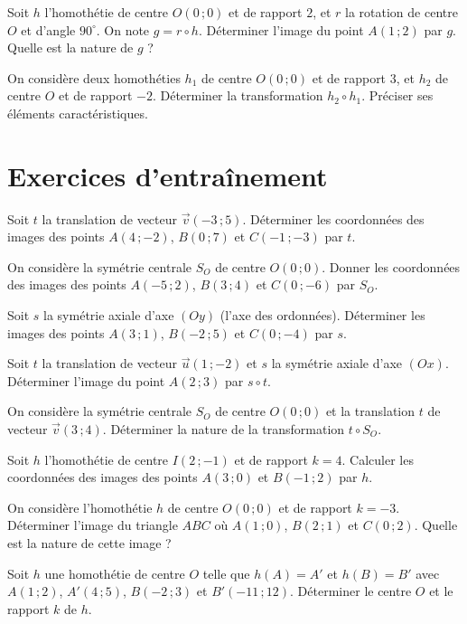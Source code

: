 \exo{}
Soit \(h\) l'homothétie de centre \(O(0\,; 0)\) et de rapport \(2\), et \(r\) la rotation de centre \(O\) et d'angle \(90^\circ\). On note \(g = r \circ h\). Déterminer l'image du point \(A(1\,; 2)\) par \(g\). Quelle est la nature de \(g\) ?

\exo{}
On considère deux homothéties \(h_1\) de centre \(O(0\,; 0)\) et de rapport \(3\), et \(h_2\) de centre \(O\) et de rapport \(-2\). Déterminer la transformation \(h_2 \circ h_1\). Préciser ses éléments caractéristiques.

\section{Exercices d'entraînement}


\exo{}
Soit \(t\) la translation de vecteur \(\vec{v}(-3\,; 5)\). Déterminer les coordonnées des images des points \(A(4\,; -2)\), \(B(0\,; 7)\) et \(C(-1\,; -3)\) par \(t\).

\exo{}
On considère la symétrie centrale \(S_O\) de centre \(O(0\,; 0)\). Donner les coordonnées des images des points \(A(-5\,; 2)\), \(B(3\,; 4)\) et \(C(0\,; -6)\) par \(S_O\).

\exo{}
Soit \(s\) la symétrie axiale d'axe \((Oy)\) (l'axe des ordonnées). Déterminer les images des points \(A(3\,; 1)\), \(B(-2\,; 5)\) et \(C(0\,; -4)\) par \(s\).

\exo{}
Soit \(t\) la translation de vecteur \(\vec{u}(1\,; -2)\) et \(s\) la symétrie axiale d'axe \((Ox)\). Déterminer l'image du point \(A(2\,; 3)\) par \(s \circ t\).

\exo{}
On considère la symétrie centrale \(S_O\) de centre \(O(0\,; 0)\) et la translation \(t\) de vecteur \(\vec{v}(3\,; 4)\). Déterminer la nature de la transformation \(t \circ S_O\).


\exo{}
Soit \(h\) l'homothétie de centre \(I(2\,; -1)\) et de rapport \(k = 4\). Calculer les coordonnées des images des points \(A(3\,; 0)\) et \(B(-1\,; 2)\) par \(h\).

\exo{}
On considère l'homothétie \(h\) de centre \(O(0\,; 0)\) et de rapport \(k = -3\). Déterminer l'image du triangle \(ABC\) où \(A(1\,; 0)\), \(B(2\,; 1)\) et \(C(0\,; 2)\). Quelle est la nature de cette image ?

\exo{}
Soit \(h\) une homothétie de centre \(O\) telle que \(h(A) = A'\) et \(h(B) = B'\) avec \(A(1\,; 2)\), \(A'(4\,; 5)\), \(B(-2\,; 3)\) et \(B'( -11\,; 12)\). Déterminer le centre \(O\) et le rapport \(k\) de \(h\).


